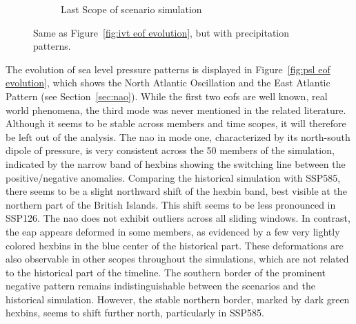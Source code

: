 \begin{figure}[!bhtp]
\begin{subfigure}[b]{0.49\textwidth}
    \caption{Last Scope of scenario simulation}
    \label{fig:pr spatial patterns endscenario}
  \end{subfigure}
  \caption[PR Spatial Modes Evolution]{Same as Figure~\ref{fig:ivt eof evolution}, but with precipitation patterns.}\label{fig:pr eof evolution}
\end{figure}

The evolution of sea level pressure patterns is displayed in Figure~\ref{fig:psl eof evolution}, which shows the North Atlantic Oscillation and the East Atlantic Pattern (see Section~\ref{sec:nao}). 
While the first two \acp{eof} are well known, real world phenomena, the third mode was never mentioned in the related literature. 
Although it seems to be stable across members and time scopes, it will therefore be left out of the analysis. 
The \ac{nao} in mode one, characterized by its north-south dipole of pressure, is very consistent across the 50 members of the simulation, indicated by the narrow band of hexbins showing the switching line between the positive/negative anomalies. 
Comparing the historical simulation with SSP585, there seems to be a slight northward shift of the hexbin band, best visible at the northern part of the British Islands. 
This shift seems to be less pronounced in SSP126. 
The \ac{nao} does not exhibit outliers across all sliding windows. In contrast, the \ac{eap} appears deformed in some members, as evidenced by a few very lightly colored hexbins in the blue center of the historical part. These deformations are also observable in other scopes throughout the simulations, which are not related to the historical part of the timeline.
The southern border of the prominent negative pattern remains indistinguishable between the scenarios and the historical simulation. However, the stable northern border, marked by dark green hexbins, seems to shift further north, particularly in SSP585.




